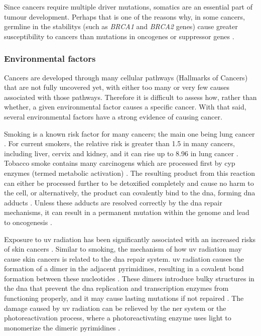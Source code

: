 Since cancers require multiple \gls{driver} mutations, \glspl{somatic} are an essential part of tumour development.
Perhaps that is one of the reasons why, in some cancers, \gls{germline} in the \glspl{stability} (such as \textit{BRCA1} and \textit{BRCA2} genes) cause greater susceptibility to cancers than mutations in \glspl{oncogene} or \gls{suppressor} genes \citep{Vogelstein2004a}.

\subsubsection{Environmental factors}
\label{ssub:environmental_factors}

Cancers are developed through many cellular pathways (Hallmarks of Cancers) that are not fully uncovered yet, with either too many or very few causes associated with those pathways.
Therefore it is difficult to assess how, rather than whether, a given environmental factor causes a specific cancer.
With that said, several environmental factors have a strong evidence of causing cancer.

Smoking is a known risk factor for many cancers; the main one being lung cancer \citep{Gandini2008,Hecht1999}.
For current smokers, the relative risk is greater than 1.5 in many cancers, including liver, cervix and kidney, and it can rise up to 8.96 in lung cancer \citep{Gandini2008}.
Tobacco smoke contains many \glspl{carcinogen} which are processed first by \gls{cyp} enzymes (termed meta\-bolic activation) \citep{Hecht1999}.
The resulting product from this reaction can either be processed further to be detoxified completely and cause no harm to the cell, or alternatively, the product can covalently bind to the \acrshort{dna}, forming \acrshort{dna} adducts \citep{Hecht1999}.
Unless these adducts are resolved correctly by the \acrshort{dna} repair mechanisms, it can result in a permanent mutation within the genome and lead to oncogenesis \citep{Hecht1999}.

Exposure to \gls{uv} radiation has been significantly associated with an increased risks of skin cancers \citep{Armstrong2001,Gallagher2006}.
Similar to smoking, the mechanism of how \gls{uv} radiation may cause  skin cancers is related to the \acrshort{dna} repair system.
\gls{uv} radiation causes the formation of a dimer in the adjacent pyrimidines, resulting in a covalent bond formation between these nucleotides \citep{Friedberg2003,Hoeijmakers2001}.
These dimers introduce bulky structures in the \acrshort{dna} that prevent the \acrshort{dna} replication and transcription enzymes from functioning properly, and it may cause lasting mutations if not repaired \citep{Friedberg2003,Hoeijmakers2001}.
The damage caused by \gls{uv} radiation can be relieved by the \gls{ner} system or the photoreactivation process, where a photoreactivating enzyme uses light to monomerize the dimeric pyrimidines \citep{Friedberg2003}.


